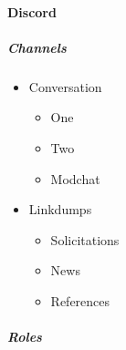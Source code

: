 \documentclass[11pt]{article}
\begin{document}
\paragraph*{Discord}
\label{sec:orgd52039e}
\subparagraph*{Channels}
\label{sec:orgbdac90c}
\begin{itemize}
\item Conversation
\label{sec:org9eb4e75}
\begin{itemize}
\item One
\label{sec:orgbfc2211}
\item Two
\label{sec:orgf9fe4c6}
\item Modchat
\label{sec:orgab5085e}
\end{itemize}
\item Linkdumps
\label{sec:orge974c6c}
\begin{itemize}
\item Solicitations
\label{sec:org4cd2744}
\item News
\label{sec:org0244ab4}
\item References
\label{sec:orgbaf2c73}
\end{itemize}
\end{itemize}
\subparagraph*{Roles}
\label{sec:org2c368b5}
\end{document}
